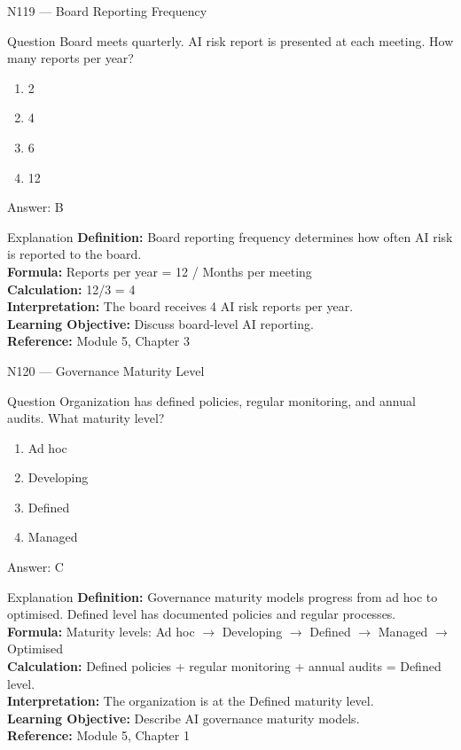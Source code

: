 \documentclass[aspectratio=169,8pt]{beamer}
\begin{document}
	\begin{frame}{N119 --- Board Reporting Frequency}
		\begin{block}{Question}
			Board meets quarterly. AI risk report is presented at each meeting. How many reports per year?
			\begin{enumerate}
				\item 2
				\item 4
				\item 6
				\item 12
			\end{enumerate}
		\end{block}
		\begin{exampleblock}{Answer: B}\end{exampleblock}
		\begin{block}{Explanation}
			\textbf{Definition:} Board reporting frequency determines how often AI risk is reported to the board.\\
			\textbf{Formula:} Reports per year = 12 / Months per meeting\\
			\textbf{Calculation:} 12/3 = 4\\
			\textbf{Interpretation:} The board receives 4 AI risk reports per year.\\
			\textbf{Learning Objective:} Discuss board-level AI reporting.\\
			\textbf{Reference:} Module 5, Chapter 3
		\end{block}
	\end{frame}
	
	\begin{frame}{N120 --- Governance Maturity Level}
		\begin{block}{Question}
			Organization has defined policies, regular monitoring, and annual audits. What maturity level?
			\begin{enumerate}
				\item Ad hoc
				\item Developing
				\item Defined
				\item Managed
			\end{enumerate}
		\end{block}
		\begin{exampleblock}{Answer: C}\end{exampleblock}
		\begin{block}{Explanation}
			\textbf{Definition:} Governance maturity models progress from ad hoc to optimised. Defined level has documented policies and regular processes.\\
			\textbf{Formula:} Maturity levels: Ad hoc $\rightarrow$ Developing $\rightarrow$ Defined $\rightarrow$ Managed $\rightarrow$ Optimised\\
			\textbf{Calculation:} Defined policies + regular monitoring + annual audits = Defined level.\\
			\textbf{Interpretation:} The organization is at the Defined maturity level.\\
			\textbf{Learning Objective:} Describe AI governance maturity models.\\
			\textbf{Reference:} Module 5, Chapter 1
		\end{block}
	\end{frame}
	
\end{document}
